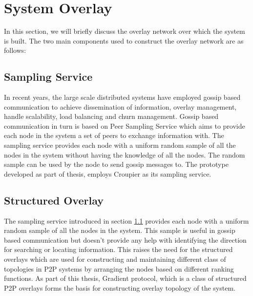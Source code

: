 \documentclass[a4paper,11pt]{kth-mag}
\begin{document}
\section{System Overlay}
In this section, we will briefly discuss the overlay network over which the system is built. The two main components used to construct the overlay network are as follows:

\subsection{Sampling Service}
\label{ssec:gossip}

In recent years, the large scale distributed systems have employed gossip based communication to achieve dissemination of information, overlay management, handle scalability, load balancing and churn management. Gossip based communication in turn is based on Peer Sampling Service\cite{samplingService} which aims to provide each node in the system a set of peers to exchange information with.  The sampling service provides each node with a uniform random sample of all the nodes in the system without having the knowledge of all the nodes. The random sample can be used by the node to send gossip messages to. The prototype developed as part of thesis, employs Croupier\cite{croupier} as its sampling service.


\subsection{Structured Overlay}

The sampling service introduced in section \ref{ssec:gossip} provides each node with a uniform random sample of all the nodes in the system. This sample is useful in gossip based communication but doesn't provide any help with identifying the direction for searching or locating information. This raises the need for the structured overlays\cite{tMan}\cite{sacha2006discovery} which are used for constructing and maintaining different class of topologies in P2P systems by arranging the nodes based on different ranking functions. As part of this thesis, Gradient\cite{sacha2006discovery} protocol, which is a class of structured P2P overlays forms the basis for constructing overlay topology of the system.
\end{document}
